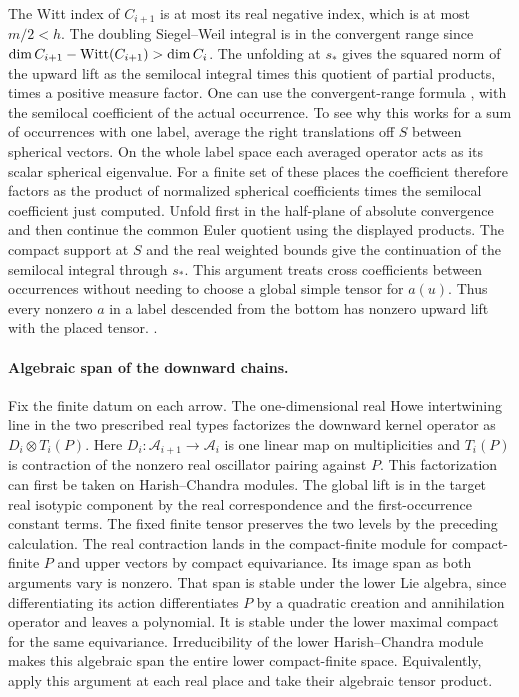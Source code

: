 The Witt index of \(C_{i+1}\) is at most its real negative index,
which is at most \(m/2<h\). The doubling Siegel--Weil integral
is in the convergent range since
\(\dim C_{i+1}-{\rm Witt}(C_{i+1})>\dim C_i\).
The unfolding at \(s_*\) gives the squared norm of the upward
lift as the semilocal integral times this quotient of partial
products, times a positive measure factor. One can use the
convergent-range formula \cite[\S8.2]{p2ichino-real-theta}, with the
semilocal coefficient of the actual occurrence. To see why this
works for a sum of occurrences with one label, average the right
translations off \(S\) between spherical vectors. On the whole
label space each averaged operator acts as its scalar spherical
eigenvalue. For a finite set of these places the coefficient
therefore factors as the product of normalized spherical
coefficients times the semilocal coefficient just computed.
Unfold first in the half-plane of absolute convergence and then
continue the common Euler quotient using the displayed products.
The compact support at \(S\) and the real weighted bounds give
the continuation of the semilocal integral through \(s_*\).
This argument treats cross coefficients between occurrences
without needing to choose a global simple tensor for \(a(u)\).
Thus every nonzero \(a\) in a label descended from the bottom has
nonzero upward lift with the placed tensor.
.

\paragraph{Algebraic span of the downward chains.}
Fix the finite datum on each arrow. The one-dimensional real
Howe intertwining line in the two prescribed real types
factorizes the downward kernel operator as \(D_i\otimes T_i(P)\).
Here \(D_i:\mathcal A_{i+1}\to\mathcal A_i\) is one linear
map on multiplicities and \(T_i(P)\) is contraction of the
nonzero real oscillator pairing against \(P\). This factorization
can first be taken on Harish--Chandra modules. The global lift is
in the target real isotypic component by the real correspondence
and the first-occurrence constant terms. The fixed finite tensor
preserves the two levels by the preceding calculation.
The real contraction lands in the compact-finite module for
compact-finite \(P\) and upper vectors by compact equivariance.
Its image span as both arguments vary is nonzero. That span is
stable under the lower Lie algebra, since differentiating its
action differentiates \(P\) by a quadratic creation and annihilation
operator and leaves a polynomial. It is stable under the lower
maximal compact for the same equivariance. Irreducibility
of the lower Harish--Chandra module makes this algebraic span
the entire lower compact-finite space. Equivalently, apply this
argument at each real place and take their algebraic tensor product.

